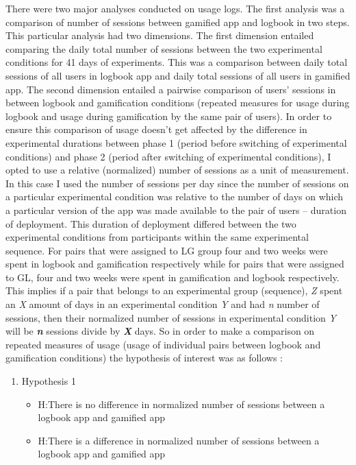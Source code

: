 There were two major analyses conducted on usage logs. The first analysis was a comparison of number of sessions between gamified app and logbook in two steps. This particular analysis had two dimensions.  The first dimension entailed comparing the daily total number of sessions between the two experimental conditions for 41 days of experiments. This was a comparison between daily total sessions of all users in logbook app and daily total sessions of all users in gamified app. The second dimension entailed a pairwise comparison of users' sessions in between logbook and gamification conditions (repeated measures for usage during logbook and usage during gamification by the same pair of users). In order to ensure this comparison of usage doesn't get affected by the difference in experimental durations between phase 1 (period before switching of experimental conditions) and phase 2 (period after switching of experimental conditions), I opted to use a relative (normalized) number of sessions  as a unit of measurement. In this case I used the number of sessions per day since the number of sessions on a particular experimental condition was relative to the number of days on which a particular version of the app was made available to the pair of users -- duration of deployment. This duration of deployment differed between the two  experimental conditions from participants within the same experimental sequence. For pairs that were assigned to LG group four and two weeks were  spent in logbook  and gamification respectively while for pairs that were assigned to GL, four and two weeks were spent in gamification and logbook respectively. This implies if a pair that belongs to an experimental group (sequence), \emph{Z} spent an \emph{X} amount of days in an experimental condition \emph{Y} and had \emph{n} number of sessions, then their normalized number of sessions in experimental condition \emph{Y} will be \emph{\textbf{n}} sessions divide by \emph{\textbf{X}} days. So in order to make a comparison on repeated measures of usage (usage of individual pairs between logbook and gamification conditions) the hypothesis of interest was as follows :

\begin{enumerate}
\item{Hypothesis 1}
\begin{itemize}
\item{H}:There is no difference in normalized number of sessions between a logbook app and gamified app
\item{H}:There is a difference in normalized number of sessions between a logbook app and gamified app
\end{itemize}
\end{enumerate}

